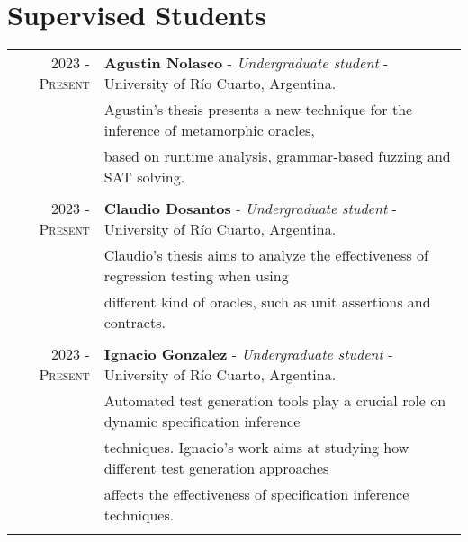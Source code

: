 \documentclass[a4paper,10pt]{article} %
\begin{document}
\section{Supervised Students}
\begin{longtable}{rl}

\textsc{2023 - Present} & \textbf{Agustin Nolasco} - \textit{Undergraduate student} - University of Río Cuarto, Argentina. \\ 
& Agustin's thesis presents a new technique for the inference of metamorphic oracles, \\ 
& based on runtime analysis, grammar-based fuzzing and SAT solving. \\ & \\

\textsc{2023 - Present} & \textbf{Claudio Dosantos} - \textit{Undergraduate student} - University of Río Cuarto, Argentina. \\
& Claudio's thesis aims to analyze the effectiveness of regression testing when using \\ 
& different kind of oracles, such as unit assertions and contracts. \\ & \\

\textsc{2023 - Present} & \textbf{Ignacio Gonzalez} - \textit{Undergraduate student} - University of Río Cuarto, Argentina. \\
& Automated test generation tools play a crucial role on dynamic specification inference \\ 
& techniques. Ignacio's work aims at studying how different test generation approaches \\ 
& affects the effectiveness of specification inference techniques. \\ & \\

\end{longtable}
\end{document}
